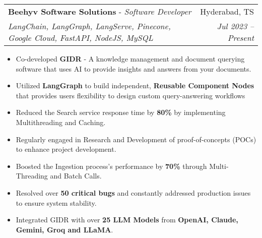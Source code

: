\documentclass[letterpaper,11pt]{article}
\makeatletter
\newcommand{\resumeItem}[1]{
  \item\small{
    {#1 \vspace{-2pt}}
  }
}
\newcommand{\resumeExperienceheading}[5]{
  \vspace{-2pt}\item
    \begin{tabular*}{0.97\textwidth}[t]{l@{\extracolsep{\fill}}r}
      \textbf{#1} - \textit{\small#2} & #3 \\
      \textit{\small#4} & \textit{\footnotesize{#5}} \\
    \end{tabular*}\vspace{-7pt}
}
\newcommand{\resumeSubSubheading}[2]{
    \item
    \begin{tabular*}{0.97\textwidth}{l@{\extracolsep{\fill}}r}
      \textit{\small{#1}} & \textit{\footnotesize{#2}} \\
    \end{tabular*}\vspace{-7pt}
}
\newcommand{\resumeItemListStart}{\begin{itemize}}
\newcommand{\resumeItemListEnd}{\end{itemize}\vspace{-5pt}}
\makeatother
\begin{document}
\vspace{5pt}

\resumeExperienceheading
{Beehyv Software Solutions}{Software Developer}{Hyderabad, TS}
{LangChain, LangGraph, LangServe, Pinecone, Google Cloud, FastAPI, NodeJS, MySQL}{Jul 2023 -- Present}
\resumeItemListStart
\resumeItem{Co-developed \textbf{GIDR} - A knowledge management and document querying software that uses AI to provide insights and answers from your documents.}
\resumeItem{Utilized \textbf{LangGraph} to build independent, \textbf{Reusable Component Nodes} that provides users flexibility to design custom query-answering workflows}
\resumeItem{Reduced the Search service response time by \textbf{80\%} by implementing Multithreading and Caching.}
\resumeItem{Regularly engaged in Research and Development of proof-of-concepts (POCs) to enhance project development.}
\resumeItem{Boosted the Ingestion process's performance by \textbf{70\%} through Multi-Threading and Batch Calls.}
\resumeItem{Resolved over \textbf{50 critical bugs} and constantly addressed production issues to ensure system stability.}
\resumeItem{Integrated GIDR with over \textbf{25 LLM Models} from \textbf{OpenAI, Claude, Gemini, Groq and LLaMA}.}
\resumeItemListEnd

\end{document}
